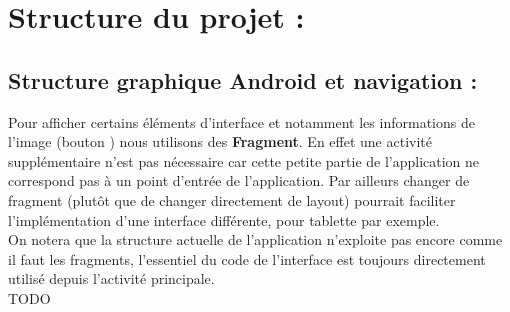 \section{Structure du projet :}

\subsection{Structure graphique Android et navigation :}
Pour afficher certains éléments d'interface et notamment les informations de l'image (bouton \faInfoCircle) nous utilisons des \textbf{Fragment}. En effet une activité supplémentaire n'est pas nécessaire car cette petite partie de l'application ne correspond pas à un point d'entrée de l'application. Par ailleurs changer de fragment (plutôt que de changer directement de layout) pourrait faciliter l'implémentation d'une interface différente, pour tablette par exemple.
\\
On notera que la structure actuelle de l'application n'exploite pas encore comme il faut les fragments, l'essentiel du code de l'interface est toujours directement utilisé depuis l'activité principale.
\\


TODO